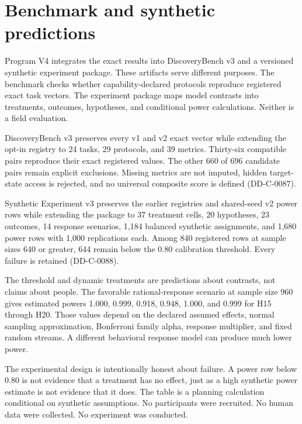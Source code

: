 \documentclass[11pt]{article}
\begin{document}
\section{Benchmark and synthetic predictions}

Program V4 integrates the exact results into DiscoveryBench v3 and a versioned
synthetic experiment package. These artifacts serve different purposes. The
benchmark checks whether capability-declared protocols reproduce registered
exact task vectors. The experiment package maps model contrasts into treatments,
outcomes, hypotheses, and conditional power calculations. Neither is a field
evaluation.

DiscoveryBench v3 preserves every v1 and v2 exact vector while extending the
opt-in registry to 24 tasks, 29 protocols, and 39 metrics. Thirty-six compatible
pairs reproduce their exact registered values. The other 660 of 696 candidate
pairs remain explicit exclusions. Missing metrics are not imputed, hidden
target-state access is rejected, and no universal composite score is defined
(DD-C-0087).

Synthetic Experiment v3 preserves the earlier registries and shared-seed v2
power rows while extending the package to 37 treatment cells, 20 hypotheses,
23 outcomes, 14 response scenarios, 1,184 balanced synthetic assignments, and
1,680 power rows with 1,000 replications each. Among 840 registered rows at
sample sizes 640 or greater, 644 remain below the 0.80 calibration threshold.
Every failure is retained (DD-C-0088).



The threshold and dynamic treatments are predictions about contrasts, not
claims about people. The favorable rational-response scenario at sample size
960 gives estimated powers 1.000, 0.999, 0.918, 0.948, 1.000, and 0.999 for
H15 through H20. Those values depend on the declared assumed effects, normal
sampling approximation, Bonferroni family alpha, response multiplier, and
fixed random streams. A different behavioral response model can produce much
lower power.



The experimental design is intentionally honest about failure. A power row
below 0.80 is not evidence that a treatment has no effect, just as a high
synthetic power estimate is not evidence that it does. The table is a planning
calculation conditional on synthetic assumptions. No participants were
recruited. No human data were collected. No experiment was conducted.
\end{document}
